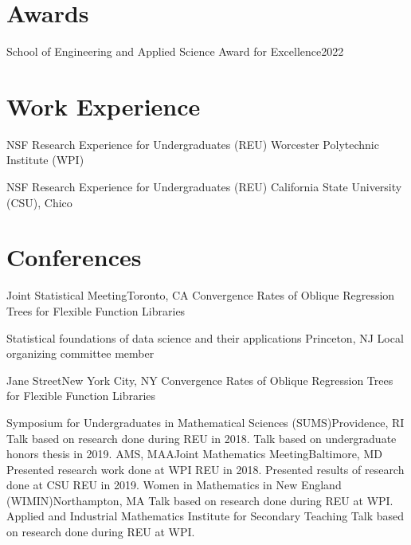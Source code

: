 \documentclass[10pt,a4paper,roman]{moderncv}        %
\begin{document}
\section{Awards}
{School of Engineering and Applied Science Award for Excellence}{2022}
{}{}

\section{Work Experience}
{NSF Research Experience for Undergraduates (REU) }
{Worcester Polytechnic Institute (WPI)}
{} {
}

{NSF Research Experience for Undergraduates (REU)}
{California State University (CSU), Chico}
{}
{}

\section{Conferences}
{Joint Statistical Meeting}{Toronto, CA}
{}{Convergence Rates of Oblique Regression Trees for Flexible Function Libraries}

{Statistical foundations of data science and their applications}
{Princeton, NJ}
{}{Local organizing committee member}

{Jane Street}{New York City, NY}
{}{Convergence Rates of Oblique Regression Trees for Flexible Function Libraries}

{Symposium for Undergraduates in Mathematical Sciences (SUMS)}{Providence, RI}
{}{Talk based on research done during REU in 2018.
  Talk based on undergraduate honors thesis in 2019.}
{AMS, MAA}{Joint Mathematics Meeting}{Baltimore, MD}
{}{Presented research work done at WPI REU in 2018.
  Presented results of research done at CSU REU in 2019.}
{Women in Mathematics in New England (WIMIN)}{Northampton, MA}
{}{Talk based on research done during REU at WPI.}
{Applied and Industrial Mathematics Institute for Secondary Teaching}
{Talk based on research done during REU at WPI.}
\end{document}
